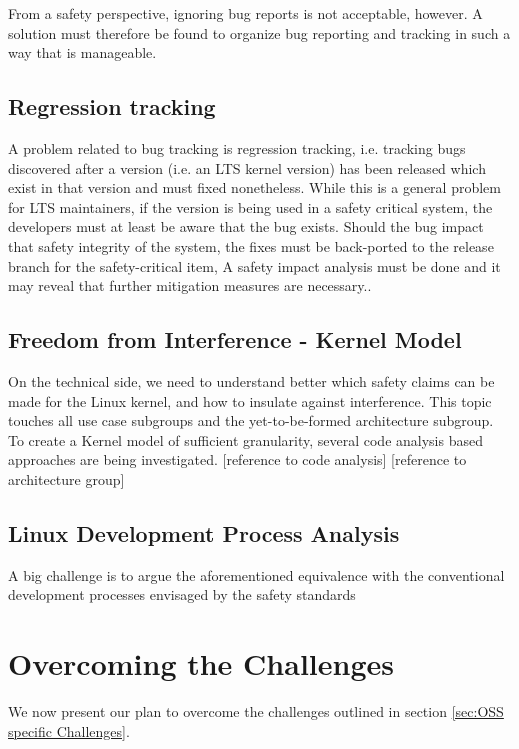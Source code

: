 \documentclass[12pt]{ElisaPaper}
\begin{document}
From a safety perspective, 
ignoring bug reports is not acceptable, however. 
A solution must therefore be found to organize bug reporting and tracking in such a way that is manageable.

\subsection{Regression tracking}
A problem related to bug tracking is regression tracking, 
i.e. tracking bugs discovered after 
a version (i.e. an LTS kernel version) has been released
which exist in that version
and 
must fixed nonetheless.
While this is a general problem for LTS maintainers,
if the version is being used in a safety critical system, 
the developers must at least be aware that the bug exists.
Should the bug impact that safety integrity of the system, 
the fixes must be back-ported to the release branch for the safety-critical item, 
A safety impact analysis must be done and it may reveal that further mitigation measures are necessary..



\subsection{Freedom from Interference - Kernel Model}
On the technical side, we need to understand better which safety claims can be made for the Linux kernel, 
and how to insulate against interference. 
This topic touches all use case subgroups and the yet-to-be-formed architecture subgroup.
To create a Kernel model of sufficient granularity, 
several code analysis based approaches are being investigated.
[reference to code analysis]
[reference to architecture group]

\subsection{Linux Development Process Analysis}
A big challenge is to argue the aforementioned equivalence with the conventional development processes envisaged by the safety standards 


\section{Overcoming the Challenges}
We now present our plan to overcome the challenges outlined in section \ref{sec:OSS specific Challenges}.
\end{document}
